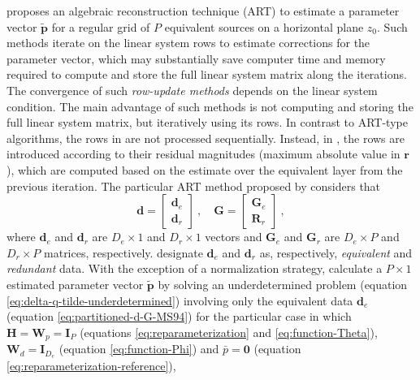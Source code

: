 \cite{mendonca-silva1994} proposes an algebraic reconstruction technique (ART) \cite[e.g.,][p. 58]{sluis-vorst1987}
to estimate a parameter vector $\tilde{\mathbf{p}}$ for a regular grid of $P$ equivalent sources on a horizontal plane $z_{0}$.
Such methods iterate on the linear system rows to estimate corrections for the parameter vector,
which may substantially save computer time and memory required to compute and store the full linear system matrix
along the iterations.
The convergence of such \textit{row-update methods} depends on the linear system condition.
The main advantage of such methods is not computing and storing the full linear system matrix, but iteratively using 
its rows.
In contrast to ART-type algorithms, the rows in \cite{mendonca-silva1994} are not processed sequentially. 
Instead, in \cite{mendonca-silva1994}, the rows are introduced according to their residual magnitudes
(maximum absolute value in $\mathbf{r}$), which are computed based on the estimate over the equivalent layer from the previous iteration.
The particular ART method proposed by \cite{mendonca-silva1994} considers that
\begin{equation}
	\mathbf{d} = \begin{bmatrix}
		\mathbf{d}_{e} \\ \mathbf{d}_{r}
	\end{bmatrix} \: , \quad 
	\mathbf{G} = \begin{bmatrix}
		\mathbf{G}_{e} \\ \mathbf{R}_{r}
	\end{bmatrix} \: ,
	\label{eq:partitioned-d-G-MS94}
\end{equation}
where $\mathbf{d}_{e}$ and $\mathbf{d}_{r}$ are $D_{e} \times 1$ and $D_{r} \times 1$ vectors and
$\mathbf{G}_{e}$ and $\mathbf{G}_{r}$ are $D_{e} \times P$ and $D_{r} \times P$ matrices, respectively.
\cite{mendonca-silva1994} designate $\mathbf{d}_{e}$ and $\mathbf{d}_{r}$ as, respectively, \textit{equivalent} and \textit{redundant} data.
With the exception of a normalization strategy, \cite{mendonca-silva1994} calculate a $P \times 1$ estimated parameter vector $\tilde{\mathbf{p}}$ 
by solving an underdetermined problem (equation \ref{eq:delta-q-tilde-underdetermined}) involving only the equivalent data $\mathbf{d}_{e}$ 
(equation \ref{eq:partitioned-d-G-MS94})
for the particular case in which $\mathbf{H} = \mathbf{W}_{p} = \mathbf{I}_{P}$ (equations \ref{eq:reparameterization} and \ref{eq:function-Theta}),
$\mathbf{W}_{d} = \mathbf{I}_{D_{e}}$ (equation \ref{eq:function-Phi}) and $\bar{p} = \mathbf{0}$ (equation \ref{eq:reparameterization-reference}), 

